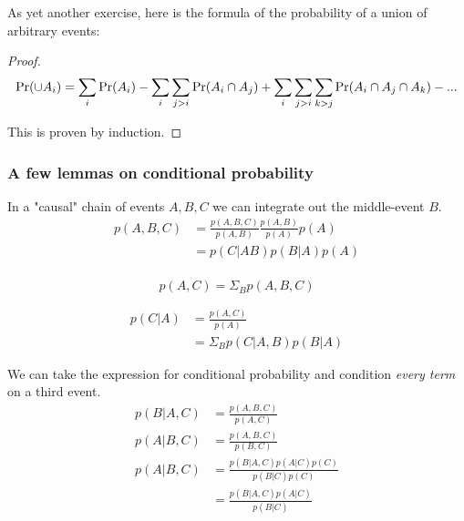 As yet another exercise, here is the formula of the probability of a union of arbitrary events: 

\begin{proof}
    $$ \operatorname{Pr} (\cup A_i) = \sum_i \operatorname{Pr}(A_i) 
            - \sum_i \sum_{j>i} \operatorname{Pr}(A_i \cap A_j) 
            + \sum_i \sum_{j>i} \sum_{k>j} \operatorname{Pr}(A_i \cap A_j \cap A_k) 
            - ...  $$
    
    This is proven by induction. 
                
    
    
\end{proof}

\subsubsection{A few lemmas on conditional probability} \label{condPropLemmas}

In a "causal" chain of events $A, B, C$ we can integrate out the middle-event $B$.
\begin{equation}
    \begin{aligned}
        p(A, B, C)  &= \frac{p(A, B, C)}{p(A, B)} \frac{p(A, B)}{p(A)} p(A) \\
                    &= p(C|AB) p(B|A) p(A) \\
    \end{aligned}
\end{equation}

\begin{equation}
    p(A, C) = \Sigma_B p(A, B, C)
\end{equation}

\begin{equation}
    \begin{aligned}
            p(C | A) &= \frac{p(A, C)}{p(A)} \\
                     &= \Sigma_B p(C|A, B) p(B|A)
    \end{aligned}
\end{equation}

We can take the expression for conditional probability and condition \emph{every term} on a third event.
\begin{equation}
    \begin{aligned}
        p(B|A, C) &= \frac{p(A, B, C)}{p(A, C)} \\
        p(A|B, C) &= \frac{p(A, B, C)}{p(B, C)} \\
        p(A|B, C) &= \frac{p(B|A, C) p(A|C) p(C)}{p(B|C)p(C)} \\
                  &= \frac{p(B|A, C) p(A|C)}{p(B|C)} \\
    \end{aligned}
\end{equation}


